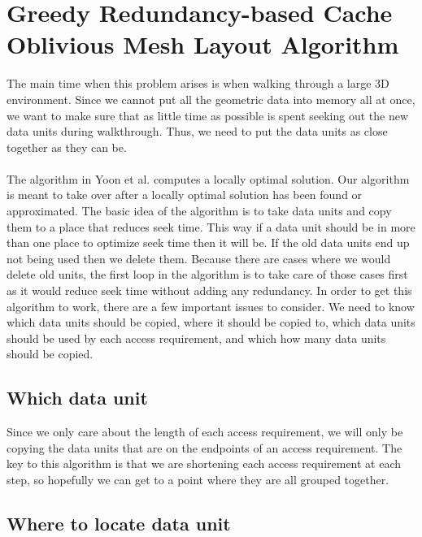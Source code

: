 \documentclass[conference]{acmsiggraph}
\begin{document}
\section{Greedy Redundancy-based Cache Oblivious Mesh Layout Algorithm}

The main time when this problem arises is when walking through a large 3D environment. Since we cannot put all the geometric data into memory all at once, we want to make sure that as little time as possible is spent seeking out the new data units during walkthrough. Thus, we need to put the data units as close together as they can be. \\
\\
The algorithm in Yoon et al. computes a locally optimal solution. Our algorithm is meant to take over after a locally optimal solution has been found or approximated. The basic idea of the algorithm is to take data units and copy them to a place that reduces seek time. This way if a data unit should be in more than one place to optimize seek time then it will be. If the old data units end up not being used then we delete them. Because there are cases where we would delete old units, the first loop in the algorithm is to take care of those cases first as it would reduce seek time without adding any redundancy. In order to get this algorithm to work, there are a few important issues to consider. We need to know which data units should be copied, where it should be copied to, which data units should be used by each access requirement, and which how many data units should be copied. 

\subsection{Which data unit}

Since we only care about the length of each access requirement, we will only be copying the data units that are on the endpoints of an access requirement. The key to this algorithm is that we are shortening each access requirement at each step, so hopefully we can get to a point where they are all grouped together. 

\subsection{Where to locate data unit}
\end{document}
